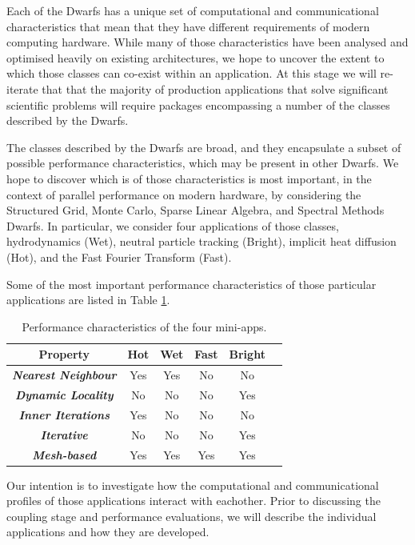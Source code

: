 \documentclass[runningheads,a4paper]{llncs}
\begin{document}
Each of the Dwarfs has a unique set of computational and communicational characteristics that mean that they have different requirements of modern computing hardware. While many of those characteristics have been analysed and optimised heavily on existing architectures, we hope to uncover the extent to which those classes can co-exist within an application. At this stage we will re-iterate that that the majority of production applications that solve significant scientific problems will require packages encompassing a number of the classes described by the Dwarfs.

The classes described by the Dwarfs are broad, and they encapsulate a subset of possible performance characteristics, which may be present in other Dwarfs. We hope to discover which is of those characteristics is most important, in the context of parallel performance on modern hardware, by considering the Structured Grid, Monte Carlo, Sparse Linear Algebra, and Spectral Methods Dwarfs. In particular, we consider four applications of those classes, hydrodynamics (Wet), neutral particle tracking (Bright), implicit heat diffusion (Hot), and the Fast Fourier Transform (Fast).

Some of the most important performance characteristics of those particular applications are listed in Table \ref{tab:perf-char-mini-apps}.

\begin{table}[h]
  \begin{center}
    \begin{tabular}{cccccc}
      \hline
      \textbf{Property} & \textbf{Hot} & \textbf{Wet} & \textbf{Fast} & \textbf{Bright} \\
      \hline
      \textit{\textbf{Nearest Neighbour}} & Yes & Yes & No & No \\
      \textit{\textbf{Dynamic Locality}} & No & No & No & Yes \\
      \textit{\textbf{Inner Iterations}} & Yes & No & No & No \\
      \textit{\textbf{Iterative}} & No & No & No & Yes \\
      \textit{\textbf{Mesh-based}} & Yes & Yes & Yes & Yes \\
    \end{tabular}
  \end{center}
  \caption{Performance characteristics of the four mini-apps.}
  \label{tab:perf-char-mini-apps}
\end{table}

Our intention is to investigate how the computational and communicational profiles of those applications interact with eachother. Prior to discussing the coupling stage and performance evaluations, we will describe the individual applications and how they are developed.
\end{document}
